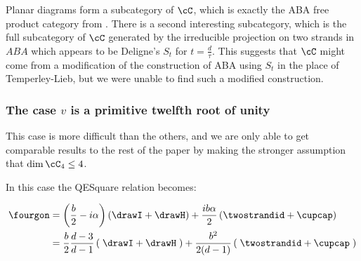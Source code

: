 \documentclass[12pt]{amsart}
\begin{document}
\begin{remark}
Planar diagrams form a subcategory of $\cC$, which is exactly the ABA free product category from \cite{???}.  There is a second interesting subcategory, which is the full subcategory of $\cC$ generated by the irreducible projection on two strands in $ABA$ which appears to be Deligne's $S_t$ for $t = \frac{d}{\tau}$.  This suggests that $\cC$ might come from a modification of the construction of ABA using $S_t$ in the place of Temperley-Lieb, but we were unable to find such a modified construction.
\end{remark}




\subsubsection{The case \texorpdfstring{$v$}{v} is a primitive twelfth root of unity}

This case is more difficult than the others, and we are only able to get comparable results to the rest of the paper by making the stronger assumption that $\dim \cC_4 \leq 4$.

In this case the QESquare relation becomes:

\begin{align*}
\fourgon &= \left(\frac{b}{2} - i \alpha\right) \left(\drawI + \drawH\right) + \frac{i b \alpha}{2} \left(\twostrandid + \cupcap\right) \\
&= \frac{b}{2}\frac{d-3}{d-1} \left(\;\drawI + \drawH\;\right) + \frac{b^2}{2(d-1)} \left(\;\twostrandid + \cupcap\;\right)
\end{align*}
\end{document}

